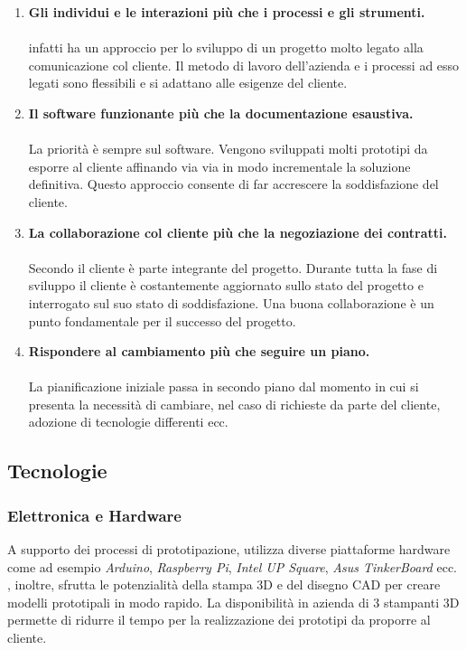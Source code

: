 \begin{enumerate}

\item \textbf{Gli individui e le interazioni più che i processi e gli strumenti.}\\
\\
\tab \lab{} infatti ha un approccio per lo sviluppo di un progetto molto legato alla comunicazione col cliente. Il metodo di lavoro dell'azienda e i processi ad esso legati sono flessibili e si adattano alle esigenze del cliente.

\item \textbf{Il software funzionante più che la documentazione esaustiva.}\\
\\
La priorità è sempre sul software. Vengono sviluppati molti prototipi da esporre al cliente affinando via via in modo incrementale la soluzione definitiva. Questo approccio consente di far accrescere la soddisfazione del cliente.

\item \textbf{La collaborazione col cliente più che la negoziazione dei contratti.}\\
\\
Secondo \lab{} il cliente è parte integrante del progetto. Durante tutta la fase di sviluppo il cliente è costantemente aggiornato sullo stato del progetto e interrogato sul suo stato di soddisfazione. Una buona collaborazione è un punto fondamentale per il successo del progetto.

\item \textbf{Rispondere al cambiamento più che seguire un piano.}\\
\\
La pianificazione iniziale passa in secondo piano dal momento in cui si presenta la necessità di cambiare, nel caso di richieste da parte del cliente, adozione di tecnologie differenti ecc.

\end{enumerate}



\newpage
\subsection{Tecnologie}

\subsubsection{Elettronica e Hardware}
A supporto dei processi di prototipazione, \lab{} utilizza diverse piattaforme hardware come ad esempio \textit{Arduino}, \textit{Raspberry Pi}, \textit{Intel UP Square}, \textit{Asus TinkerBoard} ecc.\\
\lab{}, inoltre, sfrutta le potenzialità della stampa 3D e del disegno CAD per creare modelli prototipali in modo rapido. La disponibilità in azienda di 3 stampanti 3D permette di ridurre il tempo per la realizzazione dei prototipi da proporre al cliente.

